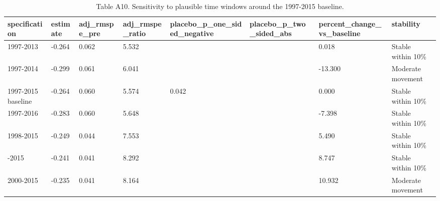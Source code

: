 \begin{table}

\caption{\label{tab:tab:sdid-window-sensitivity}Table A10. Sensitivity to plausible time windows around the 1997-2015 baseline.}
\centering
\begin{tabular}[t]{llllllll}
\toprule
specification & estimate & adj\_rmspe\_pre & adj\_rmspe\_ratio & placebo\_p\_one\_sided\_negative & placebo\_p\_two\_sided\_abs & percent\_change\_vs\_baseline & stability\\
\midrule
1997-2013 & -0.264 & 0.062 & 5.532 &  &  & 0.018 & Stable within 10\%\\
1997-2014 & -0.299 & 0.061 & 6.041 &  &  & -13.300 & Moderate movement\\
1997-2015 baseline & -0.264 & 0.060 & 5.574 & 0.042 &  & 0.000 & Stable within 10\%\\
1997-2016 & -0.283 & 0.060 & 5.648 &  &  & -7.398 & Stable within 10\%\\
1998-2015 & -0.249 & 0.044 & 7.553 &  &  & 5.490 & Stable within 10\%\\
\addlinespace
1999-2015 & -0.241 & 0.041 & 8.292 &  &  & 8.747 & Stable within 10\%\\
2000-2015 & -0.235 & 0.041 & 8.164 &  &  & 10.932 & Moderate movement\\
\bottomrule
\end{tabular}
\end{table}
